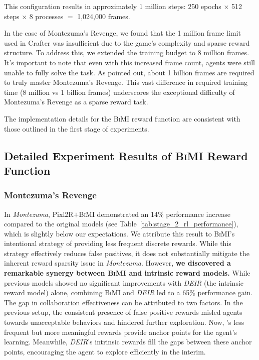 \documentclass{article}
\theoremstyle{plain}
\theoremstyle{definition}
\theoremstyle{remark}
\begin{document}
This configuration results in approximately 1 million steps: 250 epochs $\times$ 512 steps $\times$ 8 processes $=$ 1,024,000 frames.

In the case of Montezuma's Revenge, we found that the 1 million frame limit used in Crafter was insufficient due to the game's complexity and sparse reward structure. To address this, we extended the training budget to 8 million frames. It's important to note that even with this increased frame count, agents were still unable to fully solve the task. As \citet{Zhang2021NovelDAS} pointed out, about 1 billion frames are required to truly master Montezuma's Revenge. This vast difference in required training time (8 million vs 1 billion frames) underscores the exceptional difficulty of Montezuma's Revenge as a sparse reward task.

The implementation details for the \textsc{BiMI} reward function are consistent with those outlined in the first stage of experiments.

\subsection{Detailed Experiment Results of \textsc{BiMI} Reward Function}
\label{app_subsec:detailed_bimi_exp_result}

\subsubsection{Montezuma's Revenge}
\label{subsec:main_results_montezuma}
In \emph{Montezuma}, Pixl2R$+$\textsc{BiMI} demonstrated an 14\% performance increase compared to the original models (see Table~\ref{tab:stage_2_rl_performance}), which is slightly below our expectations. We attribute this result to \textsc{BiMI}'s intentional strategy of providing less frequent discrete rewards. While this strategy effectively reduces false positives, it does not substantially mitigate the inherent reward sparsity issue in \emph{Montezuma}. However, \textbf{we discovered a remarkable synergy between \textsc{BiMI} and intrinsic reward models.} While previous models showed no significant improvements with \emph{DEIR} (the intrinsic reward model) alone, combining \textsc{BiMI} and \emph{DEIR} led to a 65\% performance gain. The gap in collaboration effectiveness can be attributed to two factors. In the previous setup, the consistent presence of false positive rewards misled agents towards unacceptable behaviors and hindered further exploration. Now, 's less frequent but more meaningful rewards provide anchor points for the agent's learning. Meanwhile, \emph{DEIR}'s intrinsic rewards fill the gaps between these anchor points, encouraging the agent to explore efficiently in the interim.
\end{document}
